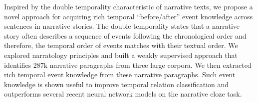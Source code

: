 Inspired by the double temporality characteristic of narrative texts, we propose a novel approach for acquiring rich temporal ``before/after'' event knowledge across sentences in narrative stories. The double temporality states that a narrative story often describes a sequence of events following the chronological order and therefore, the temporal order of events matches with their textual order. We explored narratology principles and built a weakly supervised approach that identifies 287k narrative paragraphs from three large corpora. We then extracted rich temporal event knowledge from these narrative paragraphs. Such event knowledge is shown useful to improve temporal relation classification and outperforms several recent neural network models on the narrative cloze task.
